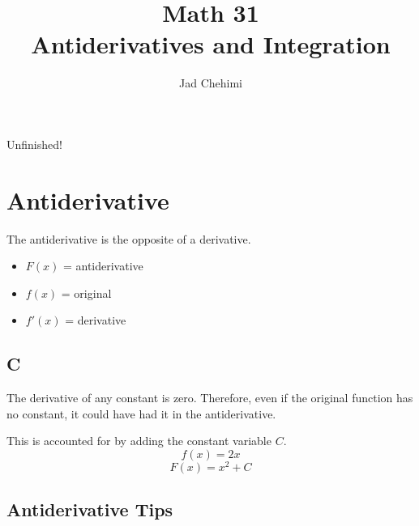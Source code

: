 \documentclass[a4paper,12pt]{article}
\title{Math 31 \\ Antiderivatives and Integration}
\author{Jad Chehimi}
\begin{document}
\maketitle

\begin{center}
\Huge
Unfinished!
\normalsize
\end{center}

\tableofcontents

\pagebreak

\section{Antiderivative}
The antiderivative is the opposite of a derivative.

\begin{itemize}
    \item{$F(x)$ = antiderivative}
    \item{$f(x)$ = original}
    \item{$f'(x)$ = derivative}
\end{itemize}

\subsection{C}
The derivative of any constant is zero. Therefore, even if the original function has no constant, it could have had it in the antiderivative.

This is accounted for by adding the constant variable $C$.
$$f(x) = 2x$$
$$F(x) = x^2 + C$$

\subsection{Antiderivative Tips}
\end{document}
